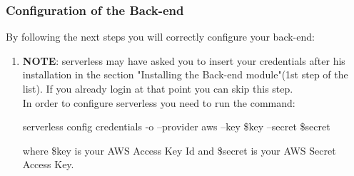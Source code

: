 \subsubsection{Configuration of the Back-end}
By following the next steps you will correctly configure your back-end:
\begin{enumerate}
\item \textbf{NOTE}: serverless may have asked you to insert your credentials after his installation in the section "Installing the Back-end module"(1st step of the list). If you already login at that point you can skip this step.\\ 
In order to configure serverless you need to run the command:
\begin{center}
serverless config credentials -o --provider aws --key \$key --secret \$secret
\end{center}
where \$key is your AWS Access Key Id and \$secret is your AWS Secret Access Key.
\end{enumerate}
